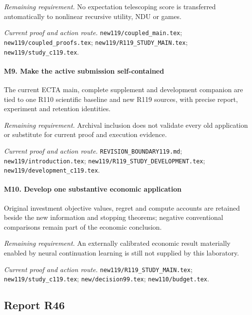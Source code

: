 \par\emph{Remaining requirement.} No expectation telescoping score is transferred automatically to nonlinear recursive utility, NDU or games.

\par\emph{Current proof and action route.} \nolinkurl{new119/coupled_main.tex}; \nolinkurl{new119/coupled_proofs.tex}; \nolinkurl{new119/R119_STUDY_MAIN.tex}; \nolinkurl{new119/study_c119.tex}.

\paragraph{M9. Make the active submission self-contained}

The current ECTA main, complete supplement and development companion are tied to one R110 scientific baseline and new R119 sources, with precise report, experiment and retention identities.

\par\emph{Remaining requirement.} Archival inclusion does not validate every old application or substitute for current proof and execution evidence.

\par\emph{Current proof and action route.} \nolinkurl{REVISION_BOUNDARY119.md}; \nolinkurl{new119/introduction.tex}; \nolinkurl{new119/R119_STUDY_DEVELOPMENT.tex}; \nolinkurl{new119/development_c119.tex}.

\paragraph{M10. Develop one substantive economic application}

Original investment objective values, regret and compute accounts are retained beside the new information and stopping theorems; negative conventional comparisons remain part of the economic conclusion.

\par\emph{Remaining requirement.} An externally calibrated economic result materially enabled by neural continuation learning is still not supplied by this laboratory.

\par\emph{Current proof and action route.} \nolinkurl{new119/R119_STUDY_MAIN.tex}; \nolinkurl{new119/study_c119.tex}; \nolinkurl{new/decision99.tex}; \nolinkurl{new110/budget.tex}.

\subsection{Report R46}

